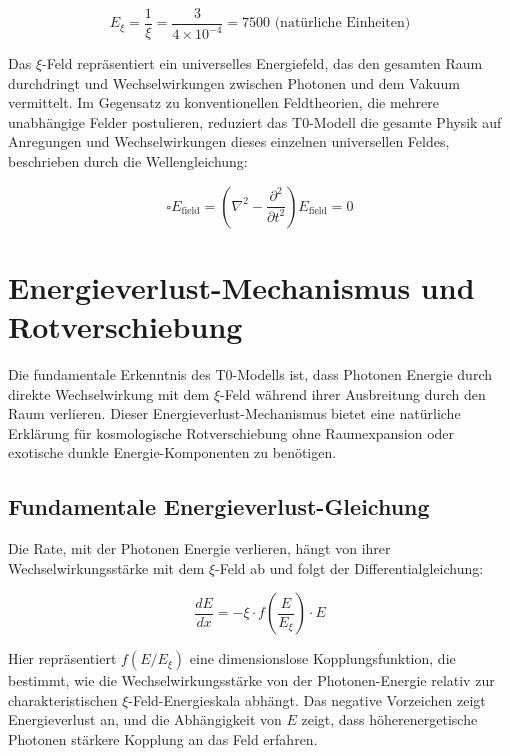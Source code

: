 \documentclass[12pt,a4paper]{article}
\begin{document}
\begin{equation}
	E_\xi = \frac{1}{\xi} = \frac{3}{4 \times 10^{-4}} = 7500 \text{ (natürliche Einheiten)}
\end{equation}
	
	Das $\xi$-Feld repräsentiert ein universelles Energiefeld, das den gesamten Raum durchdringt und Wechselwirkungen zwischen Photonen und dem Vakuum vermittelt. Im Gegensatz zu konventionellen Feldtheorien, die mehrere unabhängige Felder postulieren, reduziert das T0-Modell die gesamte Physik auf Anregungen und Wechselwirkungen dieses einzelnen universellen Feldes, beschrieben durch die Wellengleichung:
	
	\begin{equation}
		\square E_{\text{field}} = \left(\nabla^2 - \frac{\partial^2}{\partial t^2}\right) E_{\text{field}} = 0
	\end{equation}
	
	\section{Energieverlust-Mechanismus und Rotverschiebung}
	
	Die fundamentale Erkenntnis des T0-Modells ist, dass Photonen Energie durch direkte Wechselwirkung mit dem $\xi$-Feld während ihrer Ausbreitung durch den Raum verlieren. Dieser Energieverlust-Mechanismus bietet eine natürliche Erklärung für kosmologische Rotverschiebung ohne Raumexpansion oder exotische dunkle Energie-Komponenten zu benötigen.
	
	\subsection{Fundamentale Energieverlust-Gleichung}
	
	Die Rate, mit der Photonen Energie verlieren, hängt von ihrer Wechselwirkungsstärke mit dem $\xi$-Feld ab und folgt der Differentialgleichung:
	
	\begin{equation}
		\frac{dE}{dx} = -\xi \cdot f\left(\frac{E}{E_\xi}\right) \cdot E
	\end{equation}
	
	Hier repräsentiert $f(E/E_\xi)$ eine dimensionslose Kopplungsfunktion, die bestimmt, wie die Wechselwirkungsstärke von der Photonen-Energie relativ zur charakteristischen $\xi$-Feld-Energieskala abhängt. Das negative Vorzeichen zeigt Energieverlust an, und die Abhängigkeit von $E$ zeigt, dass höherenergetische Photonen stärkere Kopplung an das Feld erfahren.
	
\end{document}
